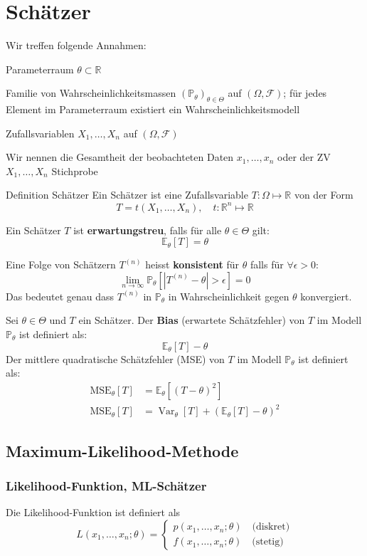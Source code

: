 \documentclass[a4paper,10pt]{article}
\def\R{\mathbb{R}}
\def\P{\mathbb{P}}
\def\F{\mathcal{F}}
\def\E{\mathbb{E}}
\DeclareMathOperator{\Var}{\text{Var}}
\begin{document}
\section{Schätzer}
Wir treffen folgende Annahmen:
\begin{rowlist}
	\item Parameterraum \(\theta \subset \R\)
	\item Familie von Wahrscheinlichkeitsmassen \((\P_\theta)_{\theta \in \Theta}\) auf \((\Omega, \F)\); für jedes Element im Parameterraum existiert ein Wahrscheinlichkeitsmodell
	\item Zufallsvariablen \(X_1, \ldots, X_n\) auf \((\Omega, \F)\)
	\item Wir nennen die Gesamtheit der beobachteten Daten \(x_1, \ldots, x_n\) oder der ZV \(X_1, \ldots, X_n\) Stichprobe
\end{rowlist}
\begin{mainbox}{Definition Schätzer}
	Ein Schätzer ist eine Zufallsvariable \(T: \Omega \mapsto \R\) von der Form
	\[T = t(X_1, \ldots, X_n), \quad t: \R^n \mapsto \R\]
\end{mainbox}

Ein Schätzer \(T\) ist \textbf{erwartungstreu}, falls für alle \(\theta \in \Theta\) gilt:
\[\E_\theta [T] = \theta\]

Eine Folge von Schätzern $T^{(n)}$ heisst \textbf{konsistent} für $\theta$ falls für $\forall \epsilon > 0$:
\[ \lim_{n \to \infty} \P_\theta \left[ \left| T^{(n)} - \theta \right| > \epsilon \right] = 0 \]
Das bedeutet genau dass $T^{(n)}$ in $\P_\theta$ in Wahrscheinlichkeit gegen $\theta$ konvergiert.

Sei \(\theta \in \Theta\) und \(T\) ein Schätzer. Der \textbf{Bias} (erwartete Schätzfehler) von \(T\) im Modell \(\P_\theta\) ist definiert als:
\[\E_\theta[T]-\theta\]
Der mittlere quadratische Schätzfehler (MSE) von \(T\) im Modell \(\P_\theta\) ist definiert als:
\begin{align*}
	\text{MSE}_\theta[T] & = \E_\theta[(T-\theta)^2]                    \\
	\text{MSE}_\theta[T] & = \Var_\theta[T] + (\E_\theta[T] - \theta)^2
\end{align*}

\subsection{Maximum-Likelihood-Methode}
\subsubsection{Likelihood-Funktion, ML-Schätzer}
Die Likelihood-Funktion ist definiert als
\[L(x_1, \ldots, x_n; \theta) = \begin{cases}
		p(x_1, \ldots, x_n; \theta) \quad \text{(diskret)} \\
		f(x_1, \ldots, x_n; \theta) \quad \text{(stetig)}
	\end{cases} \]
\end{document}
